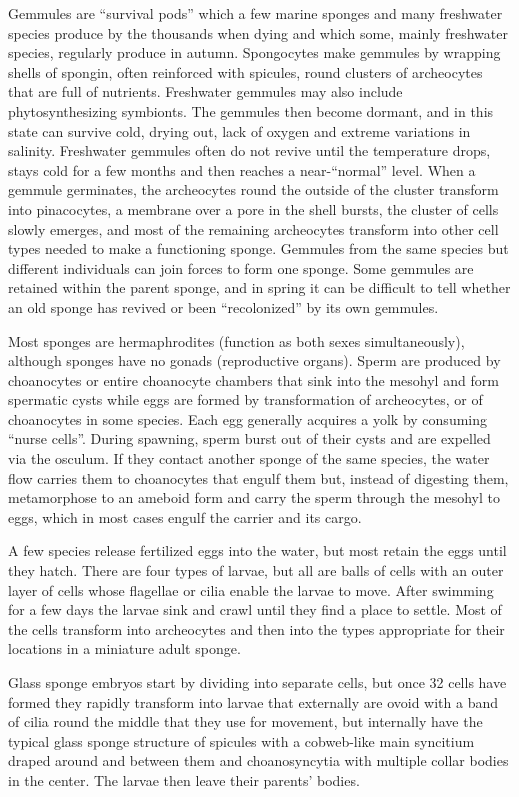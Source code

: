 Gemmules are ``survival pods'' which a few marine sponges and many freshwater species produce by the thousands when dying and which some, mainly freshwater species, regularly produce in autumn. Spongocytes make gemmules by wrapping shells of spongin, often reinforced with spicules, round clusters of archeocytes that are full of nutrients. Freshwater gemmules may also include phytosynthesizing symbionts. The gemmules then become dormant, and in this state can survive cold, drying out, lack of oxygen and extreme variations in salinity. Freshwater gemmules often do not revive until the temperature drops, stays cold for a few months and then reaches a near-``normal'' level. When a gemmule germinates, the archeocytes round the outside of the cluster transform into pinacocytes, a membrane over a pore in the shell bursts, the cluster of cells slowly emerges, and most of the remaining archeocytes transform into other cell types needed to make a functioning sponge. Gemmules from the same species but different individuals can join forces to form one sponge. Some gemmules are retained within the parent sponge, and in spring it can be difficult to tell whether an old sponge has revived or been ``recolonized'' by its own gemmules.

Most sponges are hermaphrodites (function as both sexes simultaneously), although sponges have no gonads (reproductive organs). Sperm are produced by choanocytes or entire choanocyte chambers that sink into the mesohyl and form spermatic cysts while eggs are formed by transformation of archeocytes, or of choanocytes in some species. Each egg generally acquires a yolk by consuming ``nurse cells''. During spawning, sperm burst out of their cysts and are expelled via the osculum. If they contact another sponge of the same species, the water flow carries them to choanocytes that engulf them but, instead of digesting them, metamorphose to an ameboid form and carry the sperm through the mesohyl to eggs, which in most cases engulf the carrier and its cargo.

A few species release fertilized eggs into the water, but most retain the eggs until they hatch. There are four types of larvae, but all are balls of cells with an outer layer of cells whose flagellae or cilia enable the larvae to move. After swimming for a few days the larvae sink and crawl until they find a place to settle. Most of the cells transform into archeocytes and then into the types appropriate for their locations in a miniature adult sponge.

Glass sponge embryos start by dividing into separate cells, but once 32 cells have formed they rapidly transform into larvae that externally are ovoid with a band of cilia round the middle that they use for movement, but internally have the typical glass sponge structure of spicules with a cobweb-like main syncitium draped around and between them and choanosyncytia with multiple collar bodies in the center. The larvae then leave their parents' bodies.

